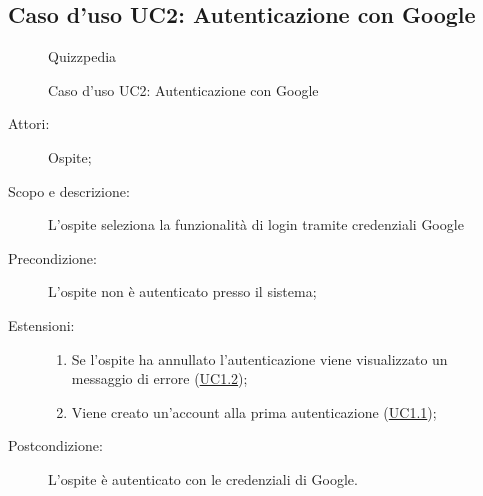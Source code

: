 \subsection{Caso d'uso UC2: Autenticazione con Google}
        \begin{figure}[H]
            \centering
            \begin{resizedtikzpicture}{\textwidth}
		\begin{umlsystem}[x=0, fill=lightgray!20]{Quizzpedia}
		\end{umlsystem}
            \end{resizedtikzpicture}
            \caption{Caso d'uso UC2: Autenticazione con Google}
            \label{fig:UC2} 
        \end{figure}
    \begin{description}
\item[Attori:] Ospite;
\item[Scopo e descrizione:] L'ospite seleziona la funzionalità di login tramite credenziali Google
      \item[Precondizione:] L'ospite non è autenticato presso il sistema;
    \item[Estensioni:]
      \begin{enumerate}
          \item Se l'ospite ha annullato l'autenticazione viene visualizzato un messaggio di errore (\hyperlink{UC1.2}{UC1.2});
          \item Viene creato un'account alla prima autenticazione (\hyperlink{UC1.1}{UC1.1});

      \end{enumerate}
    \item[Postcondizione:] L'ospite è autenticato con le credenziali di Google.
  \end{description}
\hypertarget{UC3}{}
